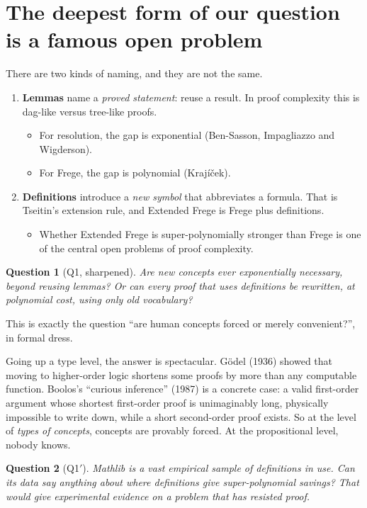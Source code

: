 \documentclass[11pt]{article}
\newtheorem*{question}{Question}
\begin{document}
\section{The deepest form of our question is a famous open problem}

There are two kinds of naming, and they are not the same.

\begin{enumerate}
\item \textbf{Lemmas} name a \emph{proved statement}: reuse a result. In proof complexity
  this is dag-like versus tree-like proofs.
  \begin{itemize}
  \item For resolution, the gap is exponential (Ben-Sasson, Impagliazzo and Wigderson).
  \item For Frege, the gap is polynomial (Kraj\'i\v{c}ek).
  \end{itemize}
\item \textbf{Definitions} introduce a \emph{new symbol} that abbreviates a formula. That
  is Tseitin's extension rule, and Extended Frege is Frege plus definitions.
  \begin{itemize}
  \item Whether Extended Frege is super-polynomially stronger than Frege is one of the
    central open problems of proof complexity.
  \end{itemize}
\end{enumerate}

\begin{question}[Q1, sharpened]
Are \emph{new concepts} ever exponentially necessary, beyond reusing lemmas? Or can every
proof that uses definitions be rewritten, at polynomial cost, using only old vocabulary?
\end{question}

\noindent This is exactly the question ``are human concepts forced or merely convenient?'',
in formal dress.

Going up a type level, the answer is spectacular. G\"odel (1936) showed that moving to
higher-order logic shortens some proofs by more than any computable function. Boolos's
``curious inference'' (1987) is a concrete case: a valid first-order argument whose shortest
first-order proof is unimaginably long, physically impossible to write down, while a short
second-order proof exists. So at the level of \emph{types of concepts}, concepts are provably
forced. At the propositional level, nobody knows.

\begin{question}[Q1$'$]
Mathlib is a vast empirical sample of definitions in use. Can its data say anything about
\emph{where} definitions give super-polynomial savings? That would give experimental
evidence on a problem that has resisted proof.
\end{question}
\end{document}
